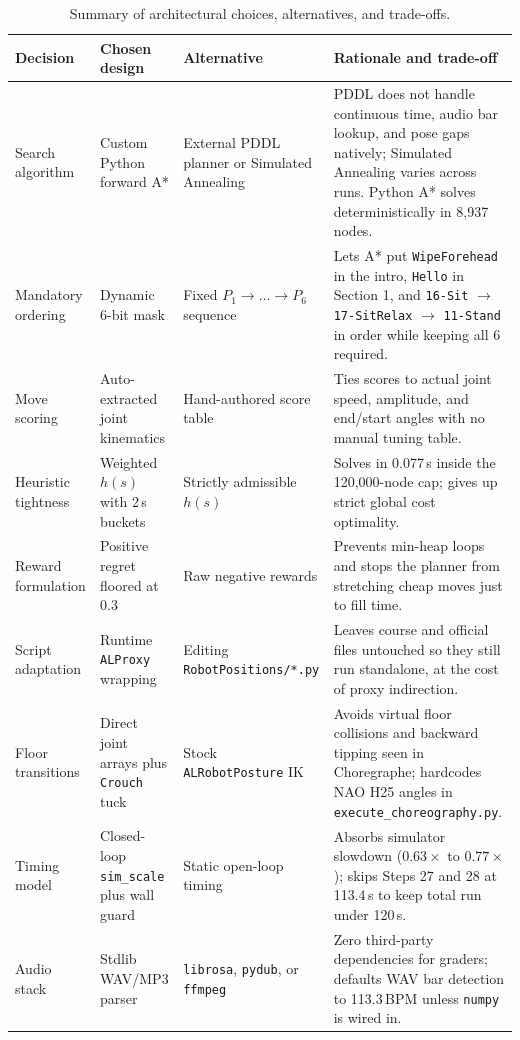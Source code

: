 \documentclass[11pt,a4paper]{article}
\newcommand{\code}[1]{\texttt{#1}}
\begin{document}
\begin{table}[H]
  \centering
  \scriptsize
  \caption{Summary of architectural choices, alternatives, and trade-offs.}
  \label{tab:decisions}
  \begin{tabularx}{\textwidth}{>{\raggedright\arraybackslash}p{2.5cm} >{\raggedright\arraybackslash}p{2.8cm} >{\raggedright\arraybackslash}p{2.8cm} X}
    \toprule
    \textbf{Decision} & \textbf{Chosen design} & \textbf{Alternative} & \textbf{Rationale and trade-off} \\
    \midrule
    Search algorithm & Custom Python forward A* & External PDDL planner or Simulated Annealing & PDDL does not handle continuous time, audio bar lookup, and pose gaps natively; Simulated Annealing varies across runs. Python A* solves deterministically in 8,937 nodes. \\
    Mandatory ordering & Dynamic 6-bit mask & Fixed $P_1 \to \dots \to P_6$ sequence & Lets A* put \code{WipeForehead} in the intro, \code{Hello} in Section 1, and \code{16-Sit} $\to$ \code{17-SitRelax} $\to$ \code{11-Stand} in order while keeping all 6 required. \\
    Move scoring & Auto-extracted joint kinematics & Hand-authored score table & Ties scores to actual joint speed, amplitude, and end/start angles with no manual tuning table. \\
    Heuristic tightness & Weighted $h(s)$ with 2\,s buckets & Strictly admissible $h(s)$ & Solves in 0.077\,s inside the 120,000-node cap; gives up strict global cost optimality. \\
    Reward formulation & Positive regret floored at 0.3 & Raw negative rewards & Prevents min-heap loops and stops the planner from stretching cheap moves just to fill time. \\
    Script adaptation & Runtime \code{ALProxy} wrapping & Editing \code{RobotPositions/}\allowbreak\code{*.py} & Leaves course and official files untouched so they still run standalone, at the cost of proxy indirection. \\
    Floor transitions & Direct joint arrays plus \code{Crouch} tuck & Stock \code{ALRobotPosture} IK & Avoids virtual floor collisions and backward tipping seen in Choregraphe; hardcodes NAO H25 angles in \code{execute\_choreography.py}. \\
    Timing model & Closed-loop \code{sim\_scale} plus wall guard & Static open-loop timing & Absorbs simulator slowdown ($0.63\times$ to $0.77\times$); skips Steps 27 and 28 at 113.4\,s to keep total run under 120\,s. \\
    Audio stack & Stdlib WAV/MP3 parser & \code{librosa}, \code{pydub}, or \code{ffmpeg} & Zero third-party dependencies for graders; defaults WAV bar detection to 113.3\,BPM unless \code{numpy} is wired in. \\
    \bottomrule
  \end{tabularx}
\end{table}

\clearpage
\end{document}
